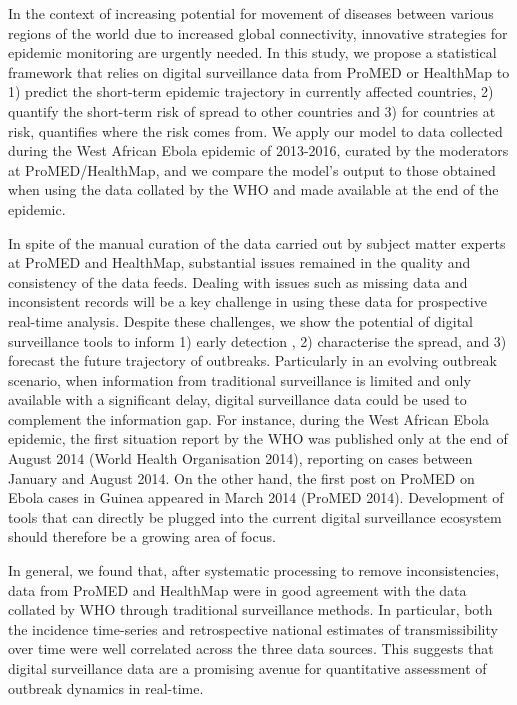 \documentclass[9pt,twocolumn,twoside,lineno]{pnas-new}
\begin{document}
In the context of increasing potential for movement of diseases between
various regions of the world due to increased global connectivity,
innovative strategies for epidemic monitoring are urgently needed. In
this study, we propose a statistical framework that relies on digital
surveillance data from ProMED or HealthMap to 1) predict the short-term
epidemic trajectory in currently affected countries, 2) quantify the
short-term risk of spread to other countries and 3) for countries at
risk, quantifies where the risk comes from. We apply our model to data
collected during the West African Ebola epidemic of 2013-2016, curated
by the moderators at ProMED/HealthMap, and we compare the model's output
to those obtained when using the data collated by the WHO and made
available at the end of the epidemic.

In spite of the manual curation of the data carried out by subject
matter experts at ProMED and HealthMap, substantial issues remained in
the quality and consistency of the data feeds. Dealing with issues such
as missing data and inconsistent records will be a key challenge in
using these data for prospective real-time analysis. Despite these
challenges, we show the potential of digital surveillance tools to
inform 1) early detection , 2) characterise the spread, and 3) forecast
the future trajectory of outbreaks. Particularly in an evolving outbreak
scenario, when information from traditional surveillance is limited and
only available with a significant delay, digital surveillance data could
be used to complement the information gap. For instance, during the West
African Ebola epidemic, the first situation report by the WHO was
published only at the end of August 2014 (World Health Organisation
2014), reporting on cases between January and August 2014. On the other
hand, the first post on ProMED on Ebola cases in Guinea appeared in
March 2014 (ProMED 2014). Development of tools that can directly be
plugged into the current digital surveillance ecosystem should therefore
be a growing area of focus.

In general, we found that, after systematic processing to remove
inconsistencies, data from ProMED and HealthMap were in good agreement
with the data collated by WHO through traditional surveillance methods.
In particular, both the incidence time-series and retrospective national
estimates of transmissibility over time were well correlated across the
three data sources. This suggests that digital surveillance data are a
promising avenue for quantitative assessment of
outbreak dynamics in real-time. 
\end{document}
